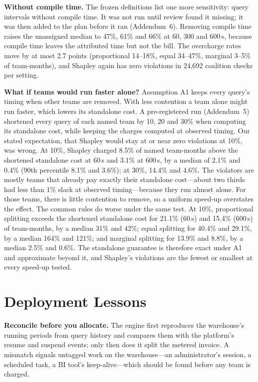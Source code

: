 \documentclass[sigconf]{acmart}
\begin{document}
\textbf{Without compile time.} The frozen definitions list one more sensitivity: query intervals without compile time.
It was not run until review found it missing; it was then added to the plan before it ran (Addendum~6). Removing
compile time raises the unassigned median to 47\%, 61\% and 66\% at 60, 300 and 600\,s, because compile time leaves the
attributed time but not the bill. The overcharge rates move by at most 2.7 points (proportional 14--18\%, equal
34--47\%, marginal 3--5\% of team-months), and Shapley again has zero violations in 24,692 coalition checks per setting.

\textbf{What if teams would run faster alone?} Assumption A1 keeps every query's timing when other teams are removed. With
less contention a team alone might run faster, which lowers its standalone cost. A pre-registered run (Addendum~5) shortened
every query of each named team by 10, 20 and 30\% when computing its standalone cost, while keeping the charges computed at
observed timing. Our stated expectation, that Shapley would stay at or near zero violations at 10\%, was wrong. At 10\%,
Shapley charged 8.5\% of named team-months above the shortened standalone cost at 60\,s and 3.1\% at 600\,s, by a median of
2.1\% and 0.4\% (90th percentile 8.1\% and 3.6\%); at 30\%, 14.4\% and 4.6\%. The violators are mostly teams that already
pay exactly their standalone cost---about two thirds had less than 1\% slack at observed timing---because they run almost
alone. For those teams, there is little contention to remove, so a uniform speed-up overstates the effect. The common rules
do worse under the same test. At 10\%, proportional splitting exceeds the shortened standalone cost for 21.1\% (60\,s) and
15.4\% (600\,s) of team-months, by a median 31\% and 42\%; equal splitting for 40.4\% and 29.1\%, by a median 164\% and
121\%; and marginal splitting for 13.9\% and 8.8\%, by a median 2.5\% and 0.6\%. The standalone guarantee is therefore exact under A1 and approximate beyond it, and Shapley's violations are the
fewest or smallest at every speed-up tested.

\section{Deployment Lessons}\label{sec:lessons}
\textbf{Reconcile before you allocate.} The engine first reproduces the warehouse's running periods from query history and
compares them with the platform's resume and suspend events; only then does it split the metered invoice. A mismatch signals
untagged work on the warehouse---an administrator's session, a scheduled task, a BI tool's keep-alive---which should be found
before any team is charged.
\end{document}
